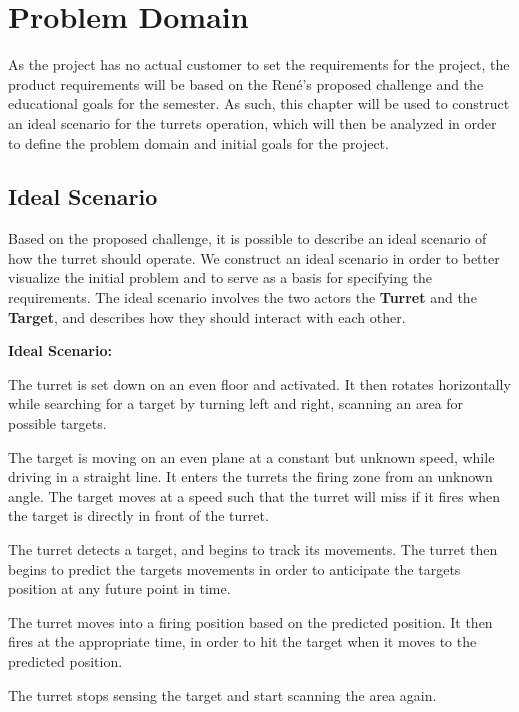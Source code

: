 \chapter{Problem Domain}\label{ProblemDomain}
As the project has no actual customer to set the requirements for the project,
the product requirements will be based on the Ren\'e's proposed challenge and
the educational goals for the semester.\nl 
As such, this chapter will be used to construct an ideal scenario for the
turrets operation, which will then be analyzed in order to define the problem
domain and initial goals for the project.

\section{Ideal Scenario}
Based on the proposed challenge, it is possible to describe an ideal scenario
of how the turret should operate. We construct an ideal scenario in order to better
visualize the initial problem and to serve as a basis for specifying the
requirements. The ideal scenario involves the two actors the \textbf{Turret} and
the \textbf{Target}, and describes how they should interact with each other.

\begin{center}
\colorbox{diff}{
\begin{minipage}{0.8\linewidth}
\textbf{Ideal Scenario:}

The turret is set down on an even floor and activated. It then rotates
horizontally while searching for a target by turning left and right, scanning an
area for possible targets.\nl

The target is moving on an even plane at a constant but unknown speed, while
driving in a straight line. It enters the turrets the firing zone from an
unknown angle. The target moves at a speed such that the turret will miss if it
fires when the target is directly in front of the turret.\nl

The turret detects a target, and begins to track its movements. The turret then
begins to predict the targets movements in order to anticipate the targets
position at any future point in time.\nl

The turret moves into a firing position based on the predicted position. It then
fires at the appropriate time, in order to hit the target when it moves to the
predicted position.\nl

The turret stops sensing the target and start scanning the area again.
\end{minipage}
}
\end{center}

